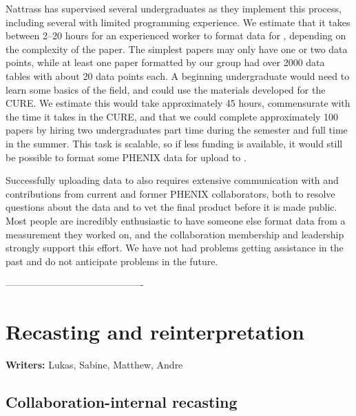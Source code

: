 \documentclass[11pt]{article}
\begin{document}
{Nattrass has supervised several undergraduates as they implement this process, including several with limited programming experience. We estimate that it takes between 2--20 hours for an experienced worker to format data for \hepdata, depending on the complexity of the paper. The simplest papers may only have one or two data points, while at least one paper formatted by our group had over 2000 data tables with about 20 data points each. A beginning undergraduate would need to learn some basics of the field, and could use the materials developed for the CURE. We estimate this would take approximately 45 hours, commensurate with the time it takes in the CURE, and that we could complete approximately 100 papers by hiring two undergraduates part time during the semester and full time in the summer. This task is scalable, so if less funding is available, it would still be possible to format some PHENIX data for upload to \hepdata.
\hrulex

Successfully uploading data to \hepdata also requires extensive communication with and contributions from current and former PHENIX collaborators, both to resolve questions about the data and to vet the final product before it is made public. Most people are incredibly enthusiastic to have someone else format data from a measurement they worked on, and the collaboration membership and leadership strongly support this effort. We have not had problems getting assistance in the past and do not anticipate problems in the future.
}


-------------------------------------------

\section{Recasting and reinterpretation}
\label{reinterpret}

\noindent\textbf{Writers:} Lukas, Sabine, Matthew, Andre\\





\subsection{Collaboration-internal recasting}
\end{document}

